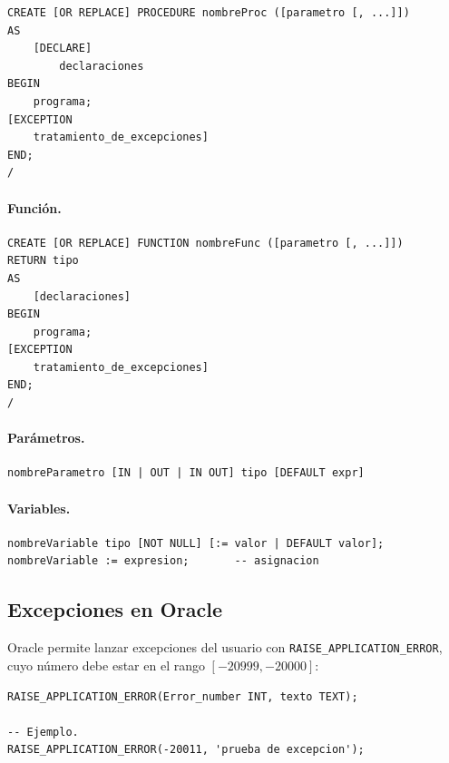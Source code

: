\documentclass[11pt,a4paper]{article}
\begin{document}
\begin{lstlisting}
CREATE [OR REPLACE] PROCEDURE nombreProc ([parametro [, ...]])
AS
    [DECLARE]
        declaraciones
BEGIN
    programa;
[EXCEPTION
    tratamiento_de_excepciones]
END;
/
\end{lstlisting}

\paragraph{Función.}

\begin{lstlisting}
CREATE [OR REPLACE] FUNCTION nombreFunc ([parametro [, ...]])
RETURN tipo
AS
    [declaraciones]
BEGIN
    programa;
[EXCEPTION
    tratamiento_de_excepciones]
END;
/
\end{lstlisting}

\paragraph{Parámetros.}

\begin{lstlisting}
nombreParametro [IN | OUT | IN OUT] tipo [DEFAULT expr]
\end{lstlisting}

\paragraph{Variables.}

\begin{lstlisting}
nombreVariable tipo [NOT NULL] [:= valor | DEFAULT valor];
nombreVariable := expresion;       -- asignacion
\end{lstlisting}

\subsection{Excepciones en Oracle}

Oracle permite lanzar excepciones del usuario con
\texttt{RAISE\_APPLICATION\_ERROR}, cuyo número debe estar en el
rango $[-20999, -20000]$:

\begin{lstlisting}
RAISE_APPLICATION_ERROR(Error_number INT, texto TEXT);

-- Ejemplo.
RAISE_APPLICATION_ERROR(-20011, 'prueba de excepcion');
\end{lstlisting}
\end{document}
